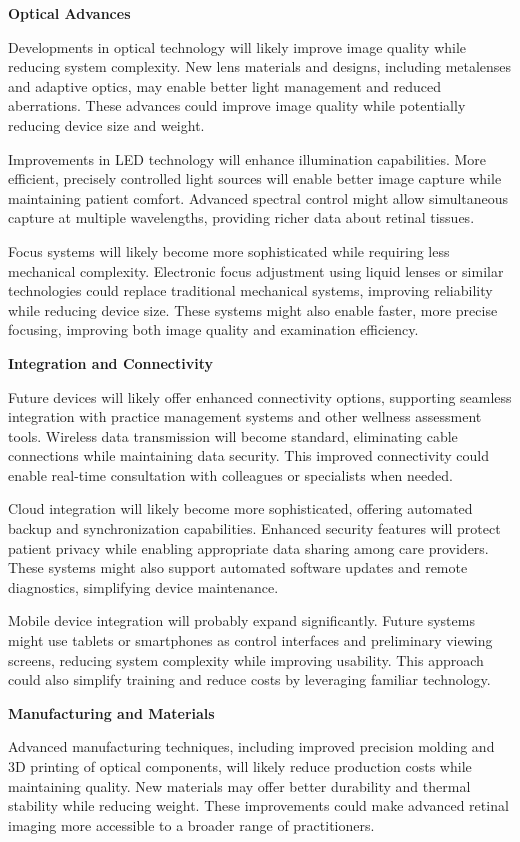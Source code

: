\documentclass[
  Letterpaper,
]{scrbook}
\begin{document}
\textbf{Optical Advances}

Developments in optical technology will likely improve image quality
while reducing system complexity. New lens materials and designs,
including metalenses and adaptive optics, may enable better light
management and reduced aberrations. These advances could improve image
quality while potentially reducing device size and weight.

Improvements in LED technology will enhance illumination capabilities.
More efficient, precisely controlled light sources will enable better
image capture while maintaining patient comfort. Advanced spectral
control might allow simultaneous capture at multiple wavelengths,
providing richer data about retinal tissues.

Focus systems will likely become more sophisticated while requiring less
mechanical complexity. Electronic focus adjustment using liquid lenses
or similar technologies could replace traditional mechanical systems,
improving reliability while reducing device size. These systems might
also enable faster, more precise focusing, improving both image quality
and examination efficiency.

\textbf{Integration and Connectivity}

Future devices will likely offer enhanced connectivity options,
supporting seamless integration with practice management systems and
other wellness assessment tools. Wireless data transmission will become
standard, eliminating cable connections while maintaining data security.
This improved connectivity could enable real-time consultation with
colleagues or specialists when needed.

Cloud integration will likely become more sophisticated, offering
automated backup and synchronization capabilities. Enhanced security
features will protect patient privacy while enabling appropriate data
sharing among care providers. These systems might also support automated
software updates and remote diagnostics, simplifying device maintenance.

Mobile device integration will probably expand significantly. Future
systems might use tablets or smartphones as control interfaces and
preliminary viewing screens, reducing system complexity while improving
usability. This approach could also simplify training and reduce costs
by leveraging familiar technology.

\textbf{Manufacturing and Materials}

Advanced manufacturing techniques, including improved precision molding
and 3D printing of optical components, will likely reduce production
costs while maintaining quality. New materials may offer better
durability and thermal stability while reducing weight. These
improvements could make advanced retinal imaging more accessible to a
broader range of practitioners.
\end{document}
